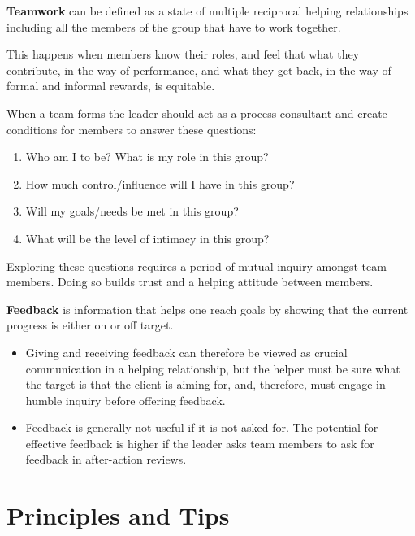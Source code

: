 \documentclass{article}
\newenvironment{nosepitemize}
{ \begin{itemize}
    \setlength{\itemsep}{0pt}
    \setlength{\parskip}{0pt}
    \setlength{\parsep}{0pt}     }
{ \end{itemize}                  }
\newenvironment{nosepenumerate}
{ \begin{enumerate}
    \setlength{\itemsep}{0pt}
    \setlength{\parskip}{0pt}
    \setlength{\parsep}{0pt}     }
{ \end{enumerate}                  }
\begin{document}
\begin{multicols}{2}

\noindent
\textbf{Teamwork} can be defined as a state of multiple reciprocal helping relationships including all the members of the group that have to work together.

This happens when members know their roles, and feel that what they contribute, in the way of performance, and what they get back, in the way of formal and informal rewards, is equitable.

When a team forms the leader should act as a process consultant and create conditions for members to answer these questions:

\begin{nosepenumerate}
    \item Who am I to be? What is my role in this group?
    \item How much control/influence will I have in this group?
    \item Will my goals/needs be met in this group?
    \item What will be the level of intimacy in this group?
\end{nosepenumerate}

Exploring these questions requires a period of mutual inquiry amongst team members. Doing so builds trust and a helping attitude between members.

\textbf{Feedback} is information that helps one reach goals by showing that the current progress is either on or off target.

\begin{nosepitemize}
    \item Giving and receiving feedback can therefore be viewed as crucial communication in a helping relationship, but the helper must be sure what the target is that the client is aiming for, and, therefore, must engage in humble inquiry before offering feedback.
    \item Feedback is generally not useful if it is not asked for. The potential for effective feedback is higher if the leader asks team members to ask for feedback in after-action reviews.
\end{nosepitemize}

\end{multicols}

\section{Principles and Tips}
\end{document}
